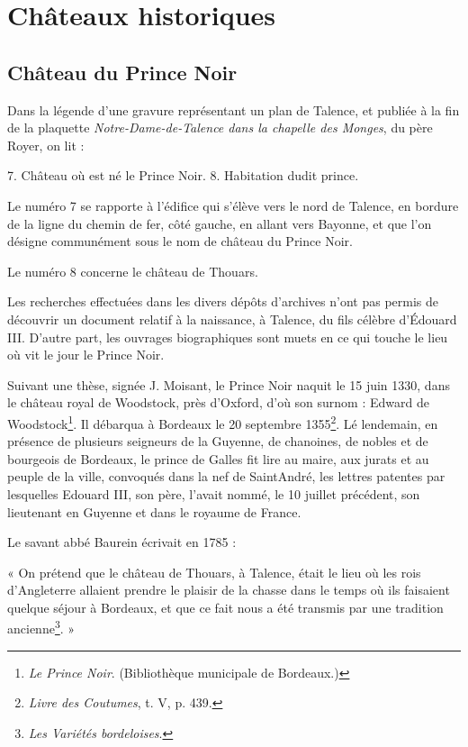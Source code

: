 
\chapter{Châteaux historiques}
\section{Château du Prince Noir}

Dans la légende d'une gravure représentant un plan de Talence, et publiée à la fin de la plaquette \textit{Notre-Dame-de-Talence dans la chapelle des Monges}, du père Royer, on lit : 

\begin{center}
7. Château où est né le Prince Noir.
8. Habitation dudit prince. 
\end{center}

Le numéro 7 se rapporte à l'édifice qui s'élève vers le nord de Talence, en bordure de la ligne du chemin de fer, côté gauche, en allant vers Bayonne, et que l'on désigne communément sous le nom de château du Prince Noir.

Le numéro 8 concerne le château de Thouars.

Les recherches effectuées dans les divers dépôts d'archives n'ont pas permis de découvrir un document relatif à la naissance, à Talence, du fils célèbre d'Édouard III. D'autre part, les ouvrages biographiques sont muets en ce qui touche le lieu où vit le jour le Prince Noir.

Suivant une thèse, signée J. Moisant, le Prince Noir naquit le 15 juin 1330, dans le château royal de Woodstock, près d'Oxford, d'où son surnom : Edward de Woodstock\footnote{\textit{Le Prince Noir}. (Bibliothèque municipale de Bordeaux.)}. Il débarqua à Bordeaux le 20 septembre 1355\footnote{\textit{Livre des Coutumes}, t. V, p. 439.}. Lé lendemain, en présence de plusieurs seigneurs de la Guyenne, de chanoines, de nobles et de bourgeois de Bordeaux, le prince de Galles fit lire au maire, aux jurats et au peuple de la ville, convoqués dans la nef de SaintAndré, les lettres patentes par lesquelles Edouard III, son père, l'avait nommé, le 10 juillet précédent, son lieutenant en Guyenne et dans le royaume de France.

Le savant abbé Baurein écrivait en 1785 : 

« On prétend que le château de Thouars, à Talence, était le lieu où les rois d'Angleterre allaient prendre le plaisir de la chasse dans le temps où ils faisaient quelque séjour à Bordeaux, et que ce fait nous a été transmis par une tradition ancienne\footnote{\textit{Les Variétés bordeloises}.}. »

